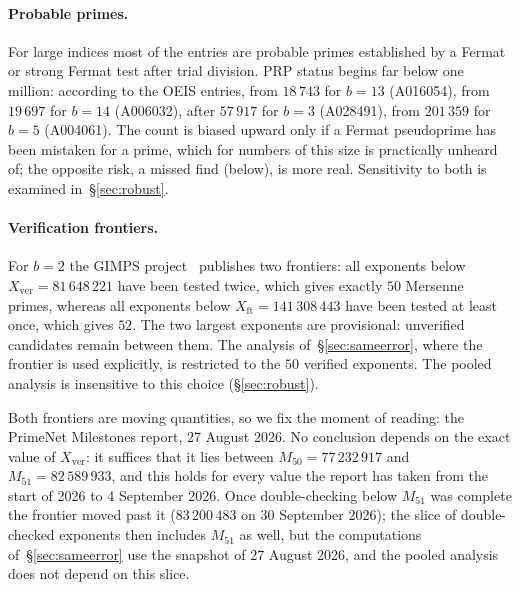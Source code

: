 \documentclass[11pt,a4paper]{article}
\theoremstyle{plain}
\theoremstyle{remark}
\begin{document}
\paragraph{Probable primes.} For large indices most of the entries are probable
primes established by a Fermat or strong Fermat test after trial division. PRP
status begins far below one million: according to the OEIS entries, from
$18\,743$ for $b=13$ (A016054), from $19\,697$ for $b=14$ (A006032), after
$57\,917$ for $b=3$ (A028491), from $201\,359$ for $b=5$ (A004061). The count is
biased upward only if a Fermat pseudoprime has been mistaken for a prime, which
for numbers of this size is practically unheard of; the opposite risk, a missed
find (below), is more real. Sensitivity to both is examined
in~\S\ref{sec:robust}.

\paragraph{Verification frontiers.} For $b=2$ the GIMPS project~\cite{gimps}
publishes two frontiers: all exponents below $X_{\mathrm{ver}}=81\,648\,221$
have been tested twice, which gives exactly $50$ Mersenne primes, whereas all
exponents below $X_{\mathrm{ft}}=141\,308\,443$ have been tested at least once,
which gives $52$. The two largest exponents are provisional: unverified
candidates remain between them. The analysis of~\S\ref{sec:sameerror}, where the
frontier is used explicitly, is restricted to the $50$ verified exponents. The
pooled analysis is insensitive to this choice (\S\ref{sec:robust}).

Both frontiers are moving quantities, so we fix the moment of reading: the
PrimeNet Milestones report, 27 August 2026. No conclusion depends on the exact
value of $X_{\mathrm{ver}}$: it suffices that it lies between
$M_{50}=77\,232\,917$ and $M_{51}=82\,589\,933$, and this holds for every value
the report has taken from the start of 2026 to 4 September 2026. Once
double-checking below $M_{51}$ was complete the frontier moved past it
($83\,200\,483$ on 30 September 2026); the slice of double-checked exponents then
includes $M_{51}$ as well, but the computations of~\S\ref{sec:sameerror} use the
snapshot of 27 August 2026, and the pooled analysis does not depend on this slice.
\end{document}
